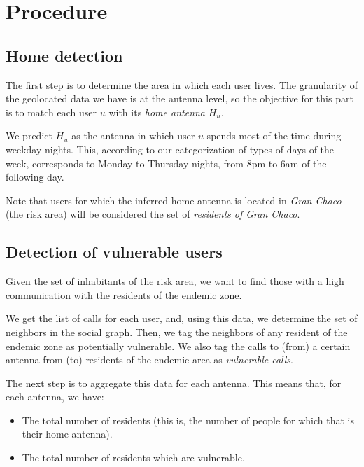 
\section{Procedure}
\subsection{Home detection}
    The first step is to determine the area in which each user lives. The granularity of the geolocated data we have is at the antenna level, so the objective for this part is to match each user $u$ with its \textit{home antenna} $H_u$.
    
    We predict $H_u$ as the antenna in which user $u$ spends most of the time during weekday nights. This, according to our categorization of types of days of the week, corresponds to Monday to Thursday nights, from 8pm to 6am of the following day.
    
    Note that users for which the inferred home antenna is located in \textit{Gran Chaco} (the risk area) will be considered the set of \textit{residents of Gran Chaco}.

\subsection{Detection of vulnerable users}
    Given the set of inhabitants of the risk area, we want to find those with a high communication with the residents of the endemic zone.
    
    We get the list of calls for each user, and, using this data, we determine the set of neighbors in the social graph. Then, we tag the neighbors of any resident of the endemic zone as potentially vulnerable. We also tag the calls to (from) a certain antenna from (to) residents of the endemic area as \textit{vulnerable calls}.
    
    The next step is to aggregate this data for each antenna. This means that, for each antenna, we have:
    \begin{itemize}
        \item The total number of residents (this is, the number of people for which that is their home antenna).
        \item The total number of residents which are vulnerable.
    \end{itemize}
    

